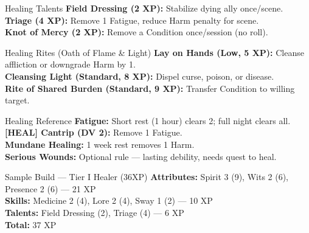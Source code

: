 \documentclass[10pt]{article}
\begin{document}
\begin{minipage}[t]{0.48\linewidth}
    \vspace{0.5em}
    
    \begin{charbox}{Healing Talents}
        \textbf{Field Dressing (2 XP):} Stabilize dying ally once/scene.\\
        \textbf{Triage (4 XP):} Remove 1 Fatigue, reduce Harm penalty for scene.\\
        \textbf{Knot of Mercy (2 XP):} Remove a Condition once/session (no roll).
    \end{charbox}
\end{minipage}
\hfill
\begin{minipage}[t]{0.48\linewidth}
    \begin{charbox}{Healing Rites (Oath of Flame \& Light)}
        \textbf{Lay on Hands (Low, 5 XP):} Cleanse affliction or downgrade Harm by 1.\\
        \textbf{Cleansing Light (Standard, 8 XP):} Dispel curse, poison, or disease.\\
        \textbf{Rite of Shared Burden (Standard, 9 XP):} Transfer Condition to willing target.
    \end{charbox}
    
    \vspace{0.5em}
    
    \begin{charbox}{Healing Reference}
        \textbf{Fatigue:} Short rest (1 hour) clears 2; full night clears all.\\
        \textbf{[HEAL] Cantrip (DV 2):} Remove 1 Fatigue.\\
        \textbf{Mundane Healing:} 1 week rest removes 1 Harm.\\
        \textbf{Serious Wounds:} Optional rule --- lasting debility, needs quest to heal.
    \end{charbox}
    
    \vspace{0.5em}
    
    \begin{charbox}{Sample Build --- Tier I Healer (36XP)}
        \textbf{Attributes:} Spirit 3 (9), Wits 2 (6), Presence 2 (6) --- 21 XP\\
        \textbf{Skills:} Medicine 2 (4), Lore 2 (4), Sway 1 (2) --- 10 XP\\
        \textbf{Talents:} Field Dressing (2), Triage (4) --- 6 XP\\
        \textbf{Total:} 37 XP
    \end{charbox}
\end{minipage}
\end{document}
